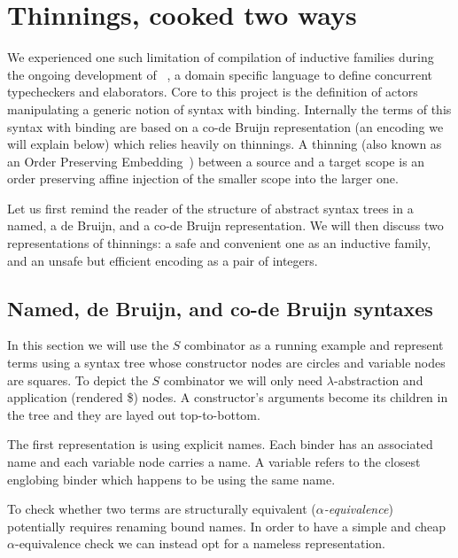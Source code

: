 \section{Thinnings, cooked two ways}\label{sec:codebruijn}

We experienced one such limitation of compilation of inductive families
during the ongoing development of
\typos~\cite{MANUAL:talk/types/Allais22}, a domain specific language
to define concurrent typecheckers and elaborators.
%
Core to this project is the definition of actors manipulating a generic notion
of syntax with binding.
%
Internally the terms of this syntax with binding are based on a co-de Bruijn
representation (an encoding we will explain below) which relies heavily on
thinnings.
%
A thinning (also known as an Order Preserving
Embedding~\cite{MANUAL:phd/nott/Chapman09})
between a source and a target scope is an order preserving affine injection
of the smaller scope into the larger one.

Let us first remind the reader of the structure of abstract syntax trees in a
named, a de Bruijn, and a co-de Bruijn representation. We will then discuss two
representations of thinnings: a safe and convenient one as an inductive family,
and an unsafe but efficient encoding as a pair of integers.

\subsection{Named, de Bruijn, and co-de Bruijn syntaxes}

In this section we will use the $S$ combinator as a running example and represent
terms using a syntax tree whose constructor nodes are circles and variable nodes
are squares.
%
To depict the $S$ combinator we will only need $\lambda{}$-abstraction and
application (rendered \$) nodes. A constructor's arguments become its children
in the tree and they are layed out top-to-bottom.

The first representation is using explicit names. Each binder has an associated
name and each variable node carries a name. A variable refers to the closest englobing
binder which happens to be using the same name.


To check whether two terms are structurally equivalent (\emph{$\alpha$-equivalence})
potentially requires renaming bound names.
%
In order to have a simple and cheap $\alpha$-equivalence check we can instead opt
for a nameless representation.

